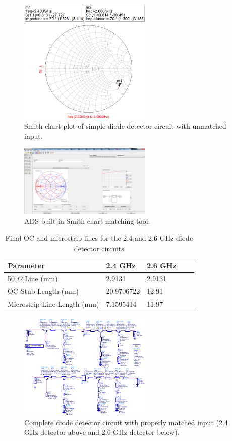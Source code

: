 \documentclass[conference]{IEEEtran}
\begin{document}
\begin{figure}[!htb]
\centering
\includegraphics[width=2.5in]{diode-pics/diodedetectorSimplifiedSmithChart.png}
\caption{Smith chart plot of simple diode detector circuit with unmatched input.}
\label{fig:DDPlot}
\end{figure}

\begin{figure}[!htb]
\centering
\includegraphics[width=2.5in]{diode-pics/smithcharttool.png}
\caption{ADS built-in Smith chart matching tool.}
\label{fig:smithchartTool}
\end{figure}

\begin{table}
\caption{Final OC and microstrip lines for the 2.4 and 2.6 GHz diode detector circuits}
\begin{tabular}{|l|l|l|l|l}
\hline
Parameter & 2.4 GHz & 2.6 GHz \\ \hline
50 $\Omega$ Line (mm) & 2.9131 & 2.9131 \\ \hline
OC Stub Length (mm) & 20.9706722 & 12.91 \\ \hline
Microstrip Line Length (mm) & 7.1595414 & 11.97 \\ \hline
\end{tabular}
\label{tab:diodetable}
\end{table}

\begin{figure}[!htb]
\centering
\includegraphics[width=2.5in]{diode-pics/diodedetectorsfinalchematic.png}
\caption{Complete diode detector circuit with properly matched input (2.4 GHz detector above and 2.6 GHz detector below).}
\label{fig:FinalDDSchematic}
\end{figure}
\end{document}
